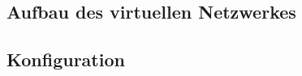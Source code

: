 \subsection{Aufbau des virtuellen Netzwerkes}

\clearpage
\pagebreak
\subsection{Konfiguration}

\clearpage
\pagebreak